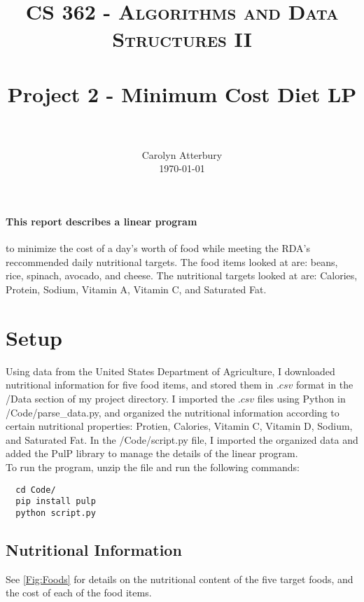 \documentclass[paper=a4, fontsize=11pt]{scrartcl}
\title{
		\usefont{OT1}{bch}{b}{n}
		\normalfont \normalsize \textsc{CS 362 - Algorithms and Data Structures II} \\ [25pt]
		\horrule{0.5pt} \\[0.4cm]
		\huge Project 2 - Minimum Cost Diet LP \\
		\horrule{2pt} \\[0.5cm]
}
\author{
		\normalfont 								\normalsize
        Carolyn Atterbury\\[-3pt]		\normalsize
        \today
}
\date{}
\numberwithin{equation}{section}		%
\numberwithin{figure}{section}			%
\numberwithin{table}{section}				%
\begin{document}
\lstset{language=bash}

\maketitle

\paragraph{This report describes a linear program}to minimize the cost of a day’s worth of food while meeting the RDA's reccommended daily nutritional targets. The food items looked at are: beans, rice, spinach, avocado, and cheese. The nutritional targets looked at are: Calories, Protein, Sodium, Vitamin A, Vitamin C, and Saturated Fat. 

\section{Setup}
Using data from the United States Department of Agriculture, I downloaded nutritional information for five food items, and stored them in $.csv$ format in the /Data section of my project directory. I imported the $.csv$ files using Python in /Code/parse\_data.py, and organized the nutritional information according to certain nutritional properties: Protien, Calories, Vitamin C, Vitamin D, Sodium, and Saturated Fat. In the /Code/script.py file, I imported the organized data and added the PulP library to manage the details of the linear program. \\

To run the program, unzip the file and run the following commands:
\begin{lstlisting}
  cd Code/
  pip install pulp
  python script.py
\end{lstlisting}


\subsection{Nutritional Information}
See \autoref{Fig:Foods} for details on the nutritional content of the five target foods, and the cost of each of the food items.
\end{document}
